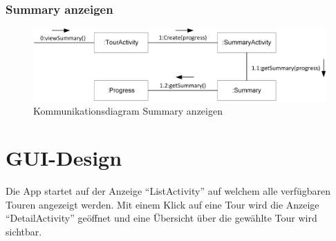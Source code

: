 \documentclass[a4paper,10pt,xetex]{article}
\begin{document}
\subsubsection{Summary anzeigen}
\begin{figure}
  \includegraphics{Kommunikationsdiagramm_SummaryActivity}
  \caption{Kommunikationsdiagram Summary anzeigen}
\end{figure}

\newpage
\section{GUI-Design}\label{gui-design}
Die App startet auf der Anzeige ``ListActivity'' auf welchem alle verfügbaren Touren angezeigt
werden. Mit einem Klick auf eine Tour wird die Anzeige ``DetailActivity'' geöffnet und eine
Übersicht über die gewählte Tour wird sichtbar.
\end{document}

